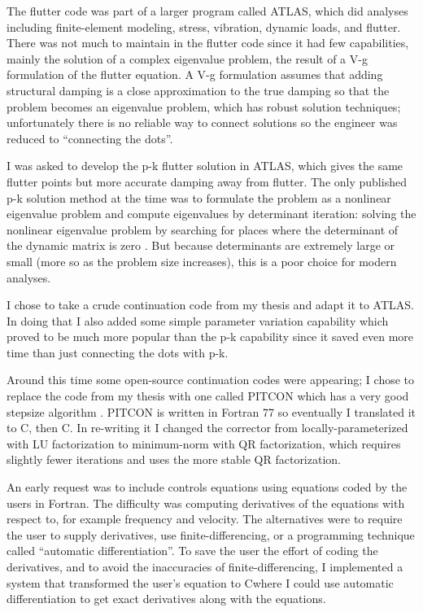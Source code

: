 \documentclass[11pt]{article}
\def\Cpp{{C\nolinebreak[4]\hspace{-.05em}\raisebox{.4ex}{\tiny\bf ++}}\:}
\begin{document}
The flutter code was part of a larger program called ATLAS, which did
analyses including finite-element modeling, stress, vibration, dynamic loads,
and flutter. There was not much to maintain in the flutter code since it
had few capabilities, mainly the solution of a complex eigenvalue problem,
the result of a V-g formulation of the flutter equation.
A V-g formulation assumes that adding structural damping is a close
approximation to the true damping so that the problem becomes an
eigenvalue problem, which has robust solution techniques;
unfortunately there is no reliable way to connect solutions so the
engineer was reduced to ``connecting the dots''.

I was asked to develop the p-k flutter solution in ATLAS, which
gives the same flutter points but more accurate damping away from flutter.
The only published p-k solution method at the time was to formulate
the problem as a nonlinear eigenvalue problem and compute eigenvalues
by determinant iteration:
solving the nonlinear eigenvalue problem by searching for places where
the determinant of the dynamic matrix is zero \cite{hassig1971approximate}.
But because determinants are extremely large or small (more so as the
problem size increases), this is a poor choice for modern analyses.

I chose to take a crude continuation code from my thesis
\cite{meyer1982aeroelastic} and adapt
it to ATLAS. In doing that I also added some simple parameter variation capability
which proved to be much more popular than the p-k capability since
it saved even more time than just connecting the dots with p-k.

Around this time some open-source continuation codes were appearing;
I chose to replace the code from my thesis with one called PITCON
which has a very good stepsize algorithm \cite{rheinboldt1983algorithm}.
PITCON is written in Fortran 77 so eventually I translated it to C, then
\Cpp. In re-writing it I changed the corrector from locally-parameterized
with LU factorization to minimum-norm with QR factorization, which requires
slightly fewer iterations and uses the more stable QR factorization.

An early request was to include controls equations using equations
coded by the users in Fortran. The difficulty was computing derivatives
of the equations with respect to, for example frequency and velocity.
The alternatives were to require the user to supply derivatives, use
finite-differencing, or a programming technique called
``automatic differentiation''.
To save the user the effort of coding the derivatives, and to
avoid the inaccuracies of finite-differencing, I implemented a system
that transformed the user's equation to \Cpp where I could use automatic
differentiation to get exact derivatives along with the equations.
\end{document}

